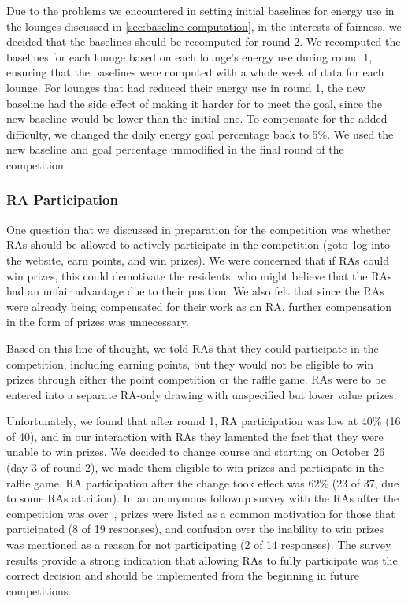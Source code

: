 Due to the problems we encountered in setting initial baselines for energy use in the lounges discussed in \autoref{sec:baseline-computation}, in the interests of fairness, we decided that the baselines should be recomputed for round 2. We recomputed the baselines for each lounge based on each lounge's energy use during round 1, ensuring that the baselines were computed with a whole week of data for each lounge. For lounges that had reduced their energy use in round 1, the new baseline had the side effect of making it harder for to meet the goal, since the new baseline would be lower than the initial one. To compensate for the added difficulty, we changed the daily energy goal percentage back to 5\%. We used the new baseline and goal percentage unmodified in the final round of the competition.


\subsubsection{RA Participation}

One question that we discussed in preparation for the competition was whether RAs should be allowed to actively participate in the competition (goto\ log into the website, earn points, and win prizes). We were concerned that if RAs could win prizes, this could demotivate the residents, who might believe that the RAs had an unfair advantage due to their position. We also felt that since the RAs were already being compensated for their work as an RA, further compensation in the form of prizes was unnecessary.

Based on this line of thought, we told RAs that they could participate in the competition, including earning points, but they would not be eligible to win prizes through either the point competition or the raffle game. RAs were to be entered into a separate RA-only drawing with unspecified but lower value prizes. 

Unfortunately, we found that after round 1, RA participation was low at 40\% (16 of 40), and in our interaction with RAs they lamented the fact that they were unable to win prizes. We decided to change course and starting on October 26 (day 3 of round 2), we made them eligible to win prizes and participate in the raffle game. RA participation after the change took effect was 62\% (23 of 37, due to some RAs attrition). In an anonymous followup survey with the RAs after the competition was over~\cite{csdl2-11-08}, prizes were listed as a common motivation for those that participated (8 of 19 responses), and confusion over the inability to win prizes was mentioned as a reason for not participating (2 of 14 responses). The survey results provide a strong indication that allowing RAs to fully participate was the correct decision and should be implemented from the beginning in future competitions.


